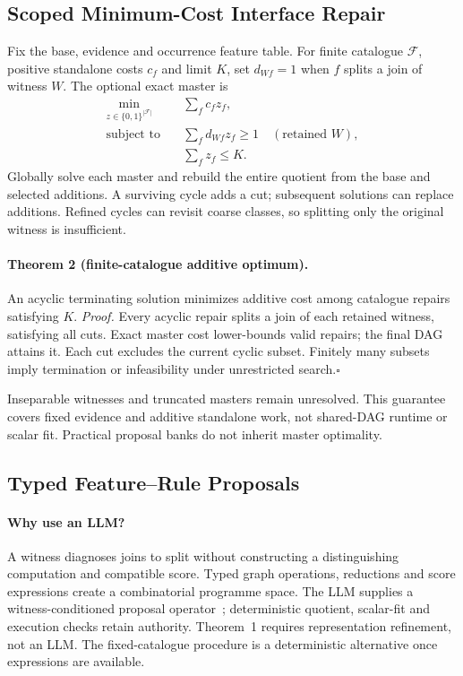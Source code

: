 \subsection{Scoped Minimum-Cost Interface Repair}
Fix the base, evidence and occurrence feature table. For finite catalogue
$\mathcal F$, positive standalone costs $c_f$ and limit $K$, set $d_{Wf}=1$
when $f$ splits a join of witness $W$. The optional exact master is
\begin{equation}
 \begin{split}
 \min_{z\in\{0,1\}^{|\mathcal F|}}\quad&\sum_f c_fz_f,\\
 \text{subject to}\quad&\sum_f d_{Wf}z_f\geq1\quad(\text{retained }W),\\
 &\sum_fz_f\leq K.
 \end{split}
 \label{eq:repair-cover}
\end{equation}
Globally solve each master and rebuild the entire quotient from the base and
selected additions. A surviving cycle adds a cut; subsequent solutions can
replace additions. Refined cycles can revisit coarse classes, so splitting
only the original witness is insufficient.

\paragraph{Theorem 2 (finite-catalogue additive optimum).}
An acyclic terminating solution minimizes additive cost among catalogue
repairs satisfying $K$.
\emph{Proof.} Every acyclic repair splits a join of each retained witness,
satisfying all cuts. Exact master cost lower-bounds valid repairs; the final
DAG attains it. Each cut excludes the current cyclic subset. Finitely many
subsets imply termination or infeasibility under unrestricted search.\hfill$\square$

Inseparable witnesses and truncated masters remain unresolved. This guarantee
covers fixed evidence and additive standalone work, not shared-DAG runtime
or scalar fit. Practical proposal banks do not inherit master optimality.

\subsection{Typed Feature--Rule Proposals}
\label{sec:method:features}
\paragraph{Why use an LLM?}
A witness diagnoses joins to split without constructing a distinguishing
computation and compatible score. Typed graph operations, reductions and
score expressions create a combinatorial programme space. The LLM supplies
a witness-conditioned proposal operator~\cite{romeraparedes2024funsearch,liu2024eoh};
deterministic quotient, scalar-fit and execution checks retain authority.
Theorem~1 requires representation refinement, not an LLM. The fixed-catalogue
procedure is a deterministic alternative once expressions are available.

